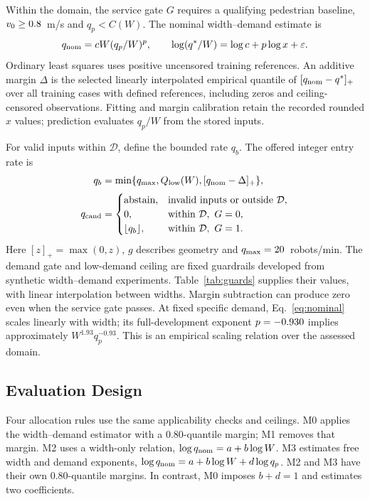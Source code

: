 \documentclass[NewProceedings,letterpaper]{ascelike-new}
\begin{document}
Within the domain, the service gate $G$ requires a qualifying pedestrian baseline, $v_0\geq0.8{}$~m/s and $q_p<C(W)$. The nominal width--demand estimate is
\begin{equation}
 q_{\rm nom}=cW(q_p/W)^p,\qquad
 \log(q^*/W)=\log c+p\log x+\varepsilon.
 \label{eq:nominal}
\end{equation}
Ordinary least squares uses positive uncensored training references. An additive margin $\Delta$ is the selected linearly interpolated empirical quantile of $[q_{\rm nom}-q^*]_+$ over all training cases with defined references, including zeros and ceiling-censored observations. Fitting and margin calibration retain the recorded rounded $x$ values; prediction evaluates $q_p/W$ from the stored inputs.

For valid inputs within $\mathcal D$, define the bounded rate $q_b$. The offered integer entry rate is
\begin{equation}
\begin{aligned}
q_b&=\min\{q_{\max},Q_{\rm low}(W),[q_{\rm nom}-\Delta]_+\},\\[2pt]
q_{\rm cand}&=\begin{cases}
\text{abstain},&\text{invalid inputs or outside }\mathcal D,\\
0,&\text{within }\mathcal D,\ G=0,\\
\lfloor q_b\rfloor,&\text{within }\mathcal D,\ G=1.
\end{cases}
\end{aligned}
\label{eq:quota}
\end{equation}
Here $[z]_+=\max(0,z)$, $g$ describes geometry and $q_{\max}=20{}$~robots/min. The demand gate and low-demand ceiling are fixed guardrails developed from synthetic width--demand experiments. Table~\ref{tab:guards} supplies their values, with linear interpolation between widths. Margin subtraction can produce zero even when the service gate passes. At fixed specific demand, Eq.~\ref{eq:nominal} scales linearly with width; its full-development exponent $p=-0.930{}$ implies approximately $W^{1.93}q_p^{-0.93}$. This is an empirical scaling relation over the assessed domain.

\begin{table}[!htbp]
\centering\caption{Demand gate and flow ceiling at assessed widths.}
\label{tab:guards}\setlength{\tabcolsep}{4.4pt}

\end{table}

\subsection{Evaluation Design}
Four allocation rules use the same applicability checks and ceilings. M0 applies the width--demand estimator with a 0.80-quantile margin; M1 removes that margin. M2 uses a width-only relation, $\log q_{\rm nom}=a+b\log W$. M3 estimates free width and demand exponents, $\log q_{\rm nom}=a+b\log W+d\log q_p$. M2 and M3 have their own 0.80-quantile margins. In contrast, M0 imposes $b+d=1$ and estimates two coefficients.
\end{document}
